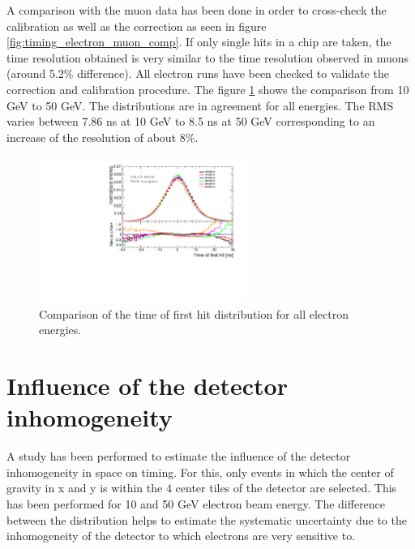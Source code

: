 A comparison with the muon data has been done in order to cross-check the calibration as well as the correction as seen in figure \ref{fig:timing_electron_muon_comp}. If only single hits in a chip are taken, the time resolution obtained is very similar to the time resolution observed in muons (around 5.2\% difference). All electron runs have been checked to validate the correction and calibration procedure. The figure \ref{fig:all_electron_energies} shows the comparison from 10 GeV to 50 GeV. The distributions are in agreement for all energies. The RMS varies between 7.86 ns at 10 GeV to 8.5 ns at 50 GeV corresponding to an increase of the resolution of about 8\%.

\begin{figure}[htbp!]
	\centering
	\includegraphics[width=0.6\textwidth]{../Thesis_Plots/Timing/Electrons/Plots/ComparisonDataEnergies.pdf}
	\caption{Comparison of the time of first hit distribution for all electron energies.}
	\label{fig:all_electron_energies}
\end{figure}

\section{Influence of the detector inhomogeneity}
\label{subsec:det_inhomo}

A study has been performed to estimate the influence of the detector inhomogeneity in space on timing. For this, only events in which the center of gravity in x and y is within the 4 center tiles of the detector are selected. This has been performed for 10 and 50 GeV electron beam energy. The difference between the distribution helps to estimate the systematic uncertainty due to the inhomogeneity of the detector to which electrons are very sensitive to.

